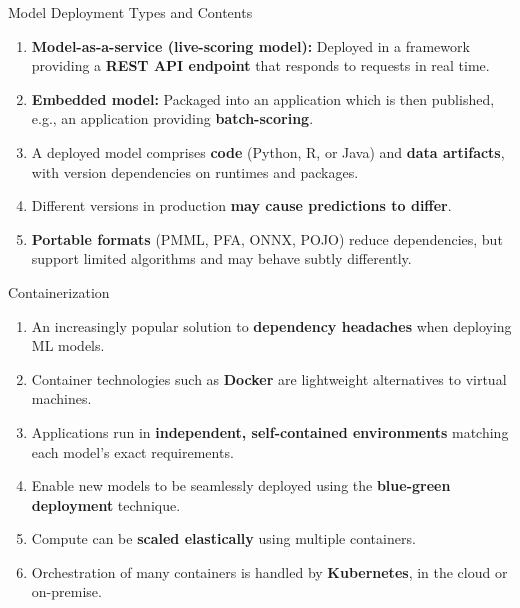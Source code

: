 \begin{frame}{Model Deployment Types and Contents}
\begin{enumerate}
\item<1-> \textbf{Model-as-a-service (live-scoring model):} Deployed in a framework providing a \textbf{REST API endpoint} that responds to requests in real time.
\item<2-> \textbf{Embedded model:} Packaged into an application which is then published, e.g., an application providing \textbf{batch-scoring}.
\item<3-> A deployed model comprises \textbf{code} (Python, R, or Java) and \textbf{data artifacts}, with version dependencies on runtimes and packages.
\item<4-> Different versions in production \textbf{may cause predictions to differ}.
\item<5-> \textbf{Portable formats} (PMML, PFA, ONNX, POJO) reduce dependencies, but support limited algorithms and may behave subtly differently.
\end{enumerate}
\end{frame}

\begin{frame}{Containerization}
\begin{enumerate}
\item<1-> An increasingly popular solution to \textbf{dependency headaches} when deploying ML models.
\item<2-> Container technologies such as \textbf{Docker} are lightweight alternatives to virtual machines.
\item<3-> Applications run in \textbf{independent, self-contained environments} matching each model's exact requirements.
\item<4-> Enable new models to be seamlessly deployed using the \textbf{blue-green deployment} technique.
\item<5-> Compute can be \textbf{scaled elastically} using multiple containers.
\item<6-> Orchestration of many containers is handled by \textbf{Kubernetes}, in the cloud or on-premise.
\end{enumerate}
\end{frame}

